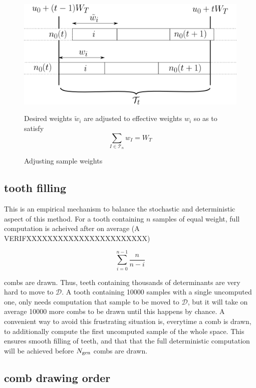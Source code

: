 \documentclass[./thesis.tex]{subfiles}
\begin{document}
 \begin{figure}[h!]
	\begin{center}
		\includegraphics[width=0.9\columnwidth]{figures/pt2/toothbuilding}
		\caption{Adjusting sample weights}
		\label{fig:toothbuilding}
		 Desired weights $\tilde w_i$ are adjusted to effective weights $w_i$ so as to satisfy
		 $$\sum_{I \in \mathcal{T}_n} w_I = W_T$$
	\end{center}
\end{figure}





\subsection*{tooth filling}

This is an empirical mechanism to balance the stochastic and deterministic aspect of this method. For a tooth containing $n$ samples of equal weight, full computation is acheived after on average (A VERIFXXXXXXXXXXXXXXXXXXXXXXX)

\begin{equation}
\sum_{i=0}^{n-1} \frac{n}{n-i}
\end{equation}

combs are drawn. Thus, teeth containing thousands of determinants are very hard to move to $\mathcal{D}$. A tooth containing 10000 samples with a single uncomputed one, only needs computation that sample to be moved to $\mathcal{D}$, but it will take on average 10000 more combs to be drawn until this happens by chance.
A convenient way to avoid this frustrating situation is, everytime a comb is drawn, to additionally compute the first uncomputed sample of the whole space. This ensures smooth filling of teeth, and that that the full deterministic computation will be achieved before ${N_\text{gen}}$ combs are drawn.


\subsection*{comb drawing order}
\end{document}
